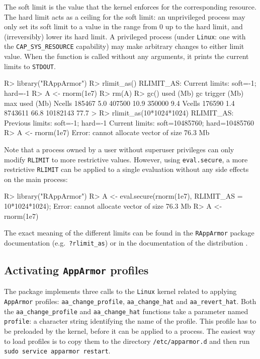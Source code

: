 \documentclass[article]{jss}
\newcommand{\AppArmor}{\texttt{AppArmor}\xspace}
\newcommand{\RAppArmor}{\pkg{RAppArmor}\xspace}
\newcommand{\Linux}{\texttt{Linux}\xspace}
\begin{document}
The soft limit is the value that the kernel enforces for the corresponding
resource. The hard limit acts as a ceiling for the soft limit: an unprivileged
process may only set its soft limit to a value in the range from 0 up to the
hard limit, and (irreversibly) lower its hard limit. A  privileged process
(under  \Linux:  one  with  the \texttt{CAP\_SYS\_RESOURCE} capability) may make
arbitrary changes to either limit value. When the function is called without any
arguments, it prints the current limits to \texttt{STDOUT}. \citep{linuxrlimit}

\begin{CodeChunk}
\begin{CodeInput}
R> library("RAppArmor")
R> rlimit_as()
RLIMIT_AS:
Current limits: soft=-1; hard=-1
R> A <- rnorm(1e7)
R> rm(A)
R> gc()
         used (Mb) gc trigger (Mb) max used (Mb)
Ncells 185467  5.0     407500 10.9   350000  9.4
Vcells 176590  1.4    8743611 66.8 10182143 77.7
>
R> rlimit_as(10*1024*1024)
RLIMIT_AS:
Previous limits: soft=-1; hard=-1
Current limits: soft=10485760; hard=10485760
R> A <- rnorm(1e7)
Error: cannot allocate vector of size 76.3 Mb
\end{CodeInput}
\end{CodeChunk}

Note that a process owned by a user without superuser privileges can only modify
\texttt{RLIMIT} to more restrictive values. However, using \texttt{eval.secure},
a more restrictive \texttt{RLIMIT} can be applied to a single evaluation without
any side effects on the main process:

\begin{CodeChunk}
\begin{CodeInput}
R> library("RAppArmor")
R> A <- eval.secure(rnorm(1e7), RLIMIT_AS = 10*1024*1024);
Error: cannot allocate vector of size 76.3 Mb
R> A <- rnorm(1e7)
\end{CodeInput}
\end{CodeChunk}

The exact meaning of the different limits can be found in the \texttt{RAppArmor}
package documentation (e.g.\ \texttt{?rlimit\_as}) or in the documentation of
the distribution \citep{ubunturlimit}.

\subsection[Activating AppArmor profiles]{Activating \AppArmor profiles}

The \RAppArmor package implements three calls to the \Linux kernel related
to applying \AppArmor profiles: \texttt{aa\_change\_profile},
\texttt{aa\_change\_hat} and \texttt{aa\_revert\_hat}. Both the
\texttt{aa\_change\_profile} and \texttt{aa\_change\_hat} functions take a
parameter named \texttt{profile}: a character string identifying the name of
the profile. This profile has to be preloaded by the kernel, before it can be
applied to a process. The easiest way to load profiles is to copy them to the
directory \texttt{/etc/apparmor.d} and then run \texttt{sudo service apparmor
restart}.
\end{document}
